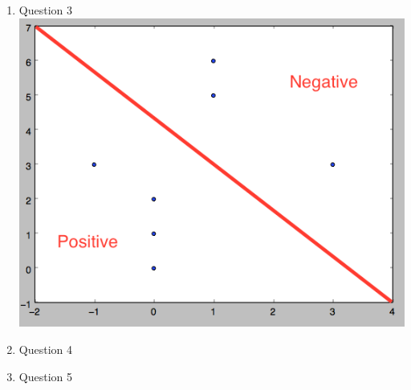 \documentclass[11pt]{article}
\begin{document}
\begin{enumerate}
\begin{enumerate}
\item ...
\end{enumerate}
\item Question 3
\includegraphics[scale=0.5]{svm}
\item Question 4
\item Question 5

\end{enumerate}
\end{document}
